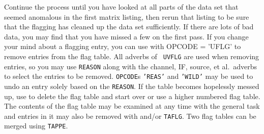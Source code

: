      Continue the process until you have looked at all parts of the
data set that seemed anomalous in the first matrix listing, then rerun
that listing to be sure that the flagging has cleaned up the data set
sufficiently.  If there are lots of bad data, you may find that you
have missed a few on the first pass.  If you change your mind about a
flagging entry, you can use {\tt {}} with {\us OPCODE =
'UFLG'} to remove entries from the flag table.  All adverbs of {\tt
UVFLG} are used when removing entries, so you may use {\tt REASON}
along with the channel, IF, source, et al.~adverbs to select the
entries to be removed.  {\tt OPCODE}s {\tt 'REAS'} and {\tt 'WILD'}
may be used to undo an entry solely based on the {\tt REASON}\@.  If
the table becomes hopelessly messed up, use {\tt {}} to
delete the flag table and start over or use a higher numbered flag
table. The contents of the flag table may be examined at any time with
the general task {\tt {}} and entries in it may also be
removed with {\tt {}} and/or \hbox{{\tt TAFLG}}.  Two flag
tables can be merged using {\tt TAPPE}\@.



